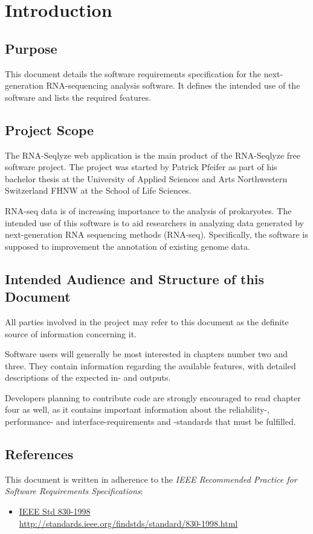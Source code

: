 \documentclass[a4paper]{srs}
\begin{document}

\tableofcontents
\newpage

	\section{Introduction}
\subsection{Purpose}
This document details the software requirements specification for the 
 next-generation RNA-sequencing analysis software. It 
defines the intended use of the software and lists the required features.

\subsection{Project Scope}
The RNA-Seqlyze web application is the main product of the RNA-Seqlyze free 
software project. The project was started by Patrick Pfeifer as part of his 
bachelor thesis at the University of Applied Sciences and Arts Northwestern 
Switzerland FHNW at the School of Life Sciences.

RNA-seq data is of increasing importance to the analysis of prokaryotes. The 
intended use of this software is to aid researchers in analyzing data generated 
by next-generation RNA sequencing methods (RNA-seq). Specifically, the software 
is supposed to improvement the annotation of existing genome data.

\subsection{Intended Audience and Structure of this Document}
All parties involved in the project may refer to this document as the definite
source of information concerning it.

Software users will generally be most interested in chapters number two and 
three. They contain information regarding the available features, with detailed
descriptions of the expected in- and outputs.

Developers planning to contribute code are strongly encouraged to read chapter
four as well, as it contains important information about the reliability-,
performance- and interface-requirements and -standards that must be fulfilled.

\subsection{References}
This document is written in adherence to the
\emph{IEEE Recommended Practice for Software Requirements Specifications}:
\begin{itemize}
\item \href{http://standards.ieee.org/findstds/standard/830-1998.html}
	{IEEE Std 830-1998\\
	\url{http://standards.ieee.org/findstds/standard/830-1998.html}}
\end{itemize}
\end{document}
